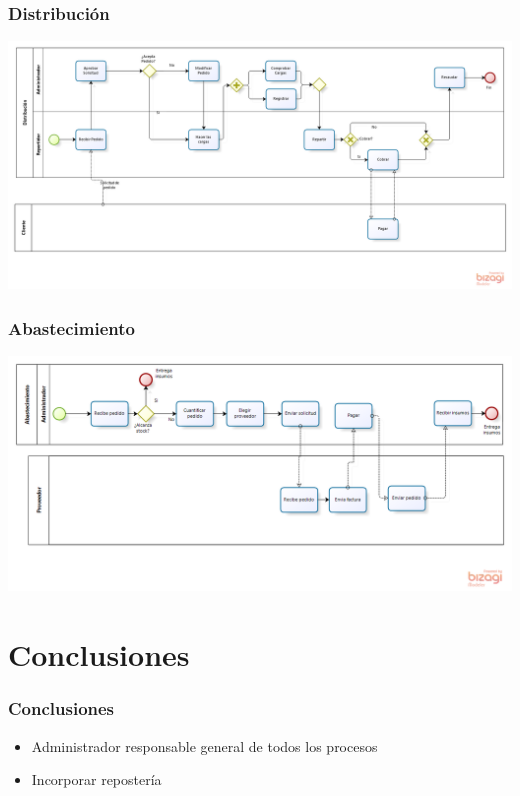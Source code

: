 \documentclass[10pt,letterpaper]{beamer}
\begin{document}
\begin{frame}
\frametitle{Distribución}
\begin{center}
\includegraphics[scale=0.2]{./imagenes/Distribucion.png}
\end{center}
\end{frame}

\begin{frame}
\frametitle{Abastecimiento}
\begin{center}
\includegraphics[scale=0.3]{./imagenes/Abastecimiento.png}
\end{center}
\end{frame}

\section{Conclusiones}
\begin{frame}
\frametitle{Conclusiones}
\begin{itemize}
\item Administrador responsable general de todos los procesos
\item Incorporar repostería
\end{itemize}
\end{frame}
\end{document}
